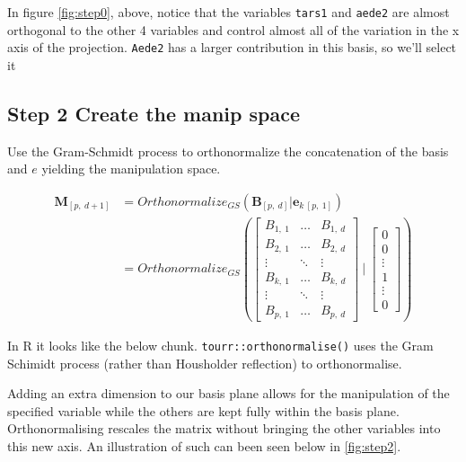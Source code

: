 \documentclass{monashthesis}
\begin{document}
In figure \ref{fig:step0}, above, notice that the variables \texttt{tars1} and \texttt{aede2} are almost orthogonal to the other 4 variables and control almost all of the variation in the x axis of the projection. \texttt{Aede2} has a larger contribution in this basis, so we'll select it

\hypertarget{step-2-create-the-manip-space}{%
\subsection{Step 2 Create the manip space}\label{step-2-create-the-manip-space}}

Use the Gram-Schmidt process to orthonormalize the concatenation of the basis and \(e\) yielding the manipulation space.

\begin{align*}
  \textbf{M}_{[p,~d+1]}
  &= Orthonormalize_{GS}( \textbf{B}_{[p,~d]}|\textbf{e}_{k~[p,~1]} ) \\
  &= Orthonormalize_{GS}
  \left(
    \begin{bmatrix}
      B_{1,~1} & \dots  & B_{1,~d} \\
      B_{2,~1} & \dots  & B_{2,~d} \\
      \vdots   & \ddots & \vdots   \\
      B_{k,~1} & \dots  & B_{k,~d} \\
      \vdots   & \ddots & \vdots   \\
      B_{p,~1} & \dots  & B_{p,~d}
    \end{bmatrix}
  ~|~
    \begin{bmatrix}
      0 \\
      0 \\
      \vdots \\
      1 \\
      \vdots \\
      0
    \end{bmatrix}
  \right)
\end{align*}

In R it looks like the below chunk. \texttt{tourr::orthonormalise()} uses the Gram Schimidt process (rather than Housholder reflection) to orthonormalise.

Adding an extra dimension to our basis plane allows for the manipulation of the specified variable while the others are kept fully within the basis plane. Orthonormalising rescales the matrix without bringing the other variables into this new axis. An illustration of such can been seen below in \ref{fig:step2}.
\end{document}
